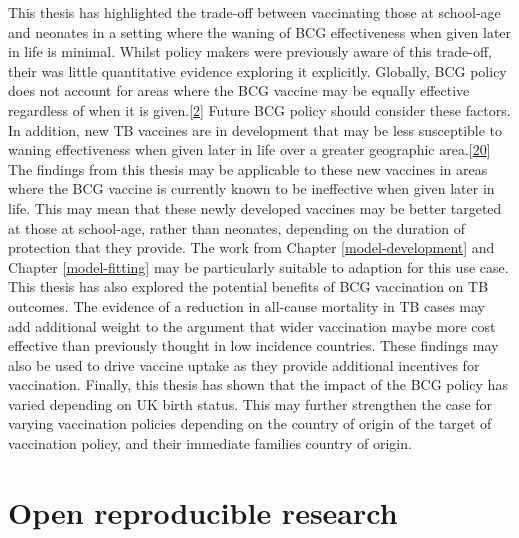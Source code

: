 \documentclass[11pt,twoside]{bristolthesis}
\begin{document}
  This thesis has highlighted the trade-off between vaccinating those at school-age and neonates in a setting where the waning of BCG effectiveness when given later in life is minimal. Whilst policy makers were previously aware of this trade-off, their was little quantitative evidence exploring it explicitly. Globally, BCG policy does not account for areas where the BCG vaccine may be equally effective regardless of when it is given.{[}\protect\hyperlink{ref-TheWorldHealthOrganization:2018va}{2}{]} Future BCG policy should consider these factors. In addition, new TB vaccines are in development that may be less susceptible to waning effectiveness when given later in life over a greater geographic area.{[}\protect\hyperlink{ref-Medicine2013}{20}{]} The findings from this thesis may be applicable to these new vaccines in areas where the BCG vaccine is currently known to be ineffective when given later in life. This may mean that these newly developed vaccines may be better targeted at those at school-age, rather than neonates, depending on the duration of protection that they provide. The work from Chapter \ref{model-development} and Chapter \ref{model-fitting} may be particularly suitable to adaption for this use case. This thesis has also explored the potential benefits of BCG vaccination on TB outcomes. The evidence of a reduction in all-cause mortality in TB cases may add additional weight to the argument that wider vaccination maybe more cost effective than previously thought in low incidence countries. These findings may also be used to drive vaccine uptake as they provide additional incentives for vaccination. Finally, this thesis has shown that the impact of the BCG policy has varied depending on UK birth status. This may further strengthen the case for varying vaccination policies depending on the country of origin of the target of vaccination policy, and their immediate families country of origin.
  
  \hypertarget{open-reproducible-research}{%
  \section{Open reproducible research}\label{open-reproducible-research}}
  
\end{document}
